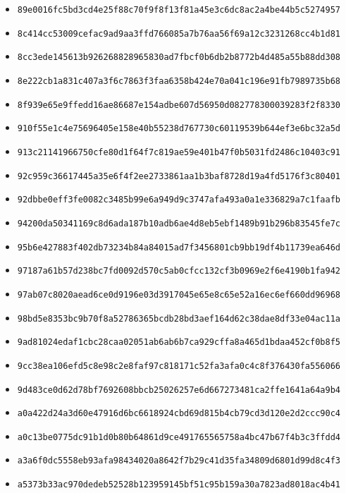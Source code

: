 {\begin{itemize}
    \item \texttt{89e0016fc5bd3cd4e25f88c70f9f8f13f81a45e3c6dc8ac2a4be44b5c5274957}
    \item \texttt{8c414cc53009cefac9ad9aa3ffd766085a7b76aa56f69a12c3231268cc4b1d81}
    \item \texttt{8cc3ede145613b926268828965830ad7fbcf0b6db2b8772b4d485a55b88dd308}
    \item \texttt{8e222cb1a831c407a3f6c7863f3faa6358b424e70a041c196e91fb7989735b68}
    \item \texttt{8f939e65e9ffedd16ae86687e154adbe607d56950d082778300039283f2f8330}
    \item \texttt{910f55e1c4e75696405e158e40b55238d767730c60119539b644ef3e6bc32a5d}
    \item \texttt{913c21141966750cfe80d1f64f7c819ae59e401b47f0b5031fd2486c10403c91}
    \item \texttt{92c959c36617445a35e6f4f2ee2733861aa1b3baf8728d19a4fd5176f3c80401}
    \item \texttt{92dbbe0eff3fe0082c3485b99e6a949d9c3747afa493a0a1e336829a7c1faafb}
    \item \texttt{94200da50341169c8d6ada187b10adb6ae4d8eb5ebf1489b91b296b83545fe7c}
    \item \texttt{95b6e427883f402db73234b84a84015ad7f3456801cb9bb19df4b11739ea646d}
    \item \texttt{97187a61b57d238bc7fd0092d570c5ab0cfcc132cf3b0969e2f6e4190b1fa942}
    \item \texttt{97ab07c8020aead6ce0d9196e03d3917045e65e8c65e52a16ec6ef660dd96968}
    \item \texttt{98bd5e8353bc9b70f8a52786365bcdb28bd3aef164d62c38dae8df33e04ac11a}
    \item \texttt{9ad81024edaf1cbc28caa02051ab6ab6b7ca929cffa8a465d1bdaa452cf0b8f5}
    \item \texttt{9cc38ea106efd5c8e98c2e8faf97c818171c52fa3afa0c4c8f376430fa556066}
    \item \texttt{9d483ce0d62d78bf7692608bbcb25026257e6d667273481ca2ffe1641a64a9b4}
    \item \texttt{a0a422d24a3d60e47916d6bc6618924cbd69d815b4cb79cd3d120e2d2ccc90c4}
    \item \texttt{a0c13be0775dc91b1d0b80b64861d9ce491765565758a4bc47b67f4b3c3ffdd4}
    \item \texttt{a3a6f0dc5558eb93afa98434020a8642f7b29c41d35fa34809d6801d99d8c4f3}
    \item \texttt{a5373b33ac970dedeb52528b123959145bf51c95b159a30a7823ad8018ac4b41}

\end{itemize}}

